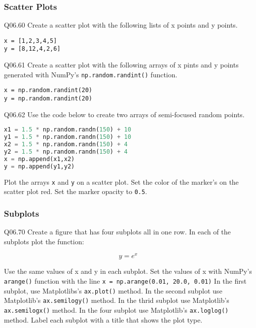 \documentclass{book}
\newcommand{\passthrough}[1]{#1}
\begin{document}
    
        \hypertarget{scatter-plots}{%
\subsubsection{Scatter Plots}\label{scatter-plots}}

Q06.60 Create a scatter plot with the following lists of x points and y
points.

\begin{lstlisting}
x = [1,2,3,4,5]
y = [8,12,4,2,6]
\end{lstlisting}

Q06.61 Create a scatter plot with the following arrays of x pints and y
points generated with NumPy's
\passthrough{\lstinline!np.random.randint()!} function.

\begin{lstlisting}
x = np.random.randint(20)
y = np.random.randint(20)
\end{lstlisting}

Q06.62 Use the code below to create two arrays of semi-focused random
points.

\begin{lstlisting}[language=Python]
x1 = 1.5 * np.random.randn(150) + 10
y1 = 1.5 * np.random.randn(150) + 10
x2 = 1.5 * np.random.randn(150) + 4
y2 = 1.5 * np.random.randn(150) + 4
x = np.append(x1,x2)
y = np.append(y1,y2)
\end{lstlisting}

Plot the arrays \passthrough{\lstinline!x!} and
\passthrough{\lstinline!y!} on a scatter plot. Set the color of the
marker's on the scatter plot red. Set the marker opacity to
\passthrough{\lstinline!0.5!}.
     
        \hypertarget{subplots}{%
\subsubsection{Subplots}\label{subplots}}

Q06.70 Create a figure that has four subplots all in one row. In each of
the subplots plot the function:

\[ y = e^x \]

Use the same values of x and y in each subplot. Set the values of x with
NumPy's \passthrough{\lstinline!arange()!} function with the line
\passthrough{\lstinline!x = np.arange(0.01, 20.0, 0.01)!} In the first
subplot, use Matplotlibs's \passthrough{\lstinline!ax.plot()!} method.
In the second subplot use Matplotlib's
\passthrough{\lstinline!ax.semilogy()!} method. In the thrid subplot use
Matplotlib's \passthrough{\lstinline!ax.semilogx()!} method. In the four
subplot use Matplotlib's \passthrough{\lstinline!ax.loglog()!} method.
Label each subplot with a title that shows the plot type.
\end{document}
